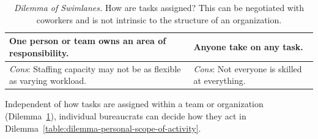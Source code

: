 \begin{center}
\begin{table}[H] %
\begin{tabular}{ | m{\dilemmatablewidth}| m{\dilemmatablewidth} | } 
  \hline
  \textbf{One person or team owns an area of responsibility.} & 
  \textbf{Anyone take on any task.} \\ 
  \hline
  \textit{Cons}: Staffing capacity may not be as flexible as varying workload. & 
  \textit{Cons}: Not everyone is skilled at everything. \\  
  \hline
\end{tabular}
\caption{
\textit{Dilemma of Swimlanes.} 
How are tasks assigned? This can be negotiated with coworkers and is not intrinsic to the structure of an organization. 
}
\label{table:dilemma-personal-swimlanes}
\end{table}
\end{center}


Independent of how tasks are assigned within a team or organization (Dilemma~\ref{table:dilemma-personal-swimlanes}), individual bureaucrats can decide how they act in Dilemma~\ref{table:dilemma-personal-scope-of-activity}.



